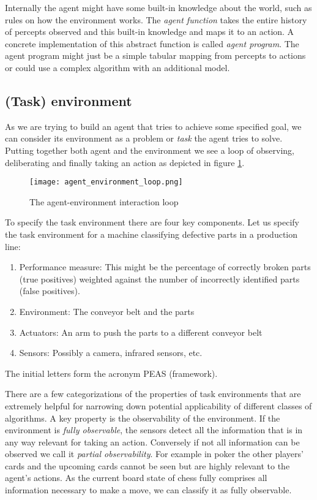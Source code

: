 Internally the agent might have some built-in knowledge about the world, such as rules on how the environment works. The \textit{agent function} takes the entire history of percepts observed and this built-in knowledge and maps it to an action. A concrete implementation of this abstract function is called \textit{agent program}. The agent program might just be a simple tabular mapping from percepts to actions or could use a complex algorithm with an additional model.

\subsection{(Task) environment}
\label{environment}

As we are trying to build an agent that tries to achieve some specified goal, we can consider its environment as a problem or \textit{task} the agent tries to solve. Putting together both agent and the environment we see a loop of observing,  deliberating and finally taking an action as depicted in figure \ref{agent_environment_loop}.

\begin{figure}
    \centering
    \texttt{[image: agent\_environment\_loop.png]}
    \caption{The agent-environment interaction loop \cite[cf. p. 96]{russell_artificial_2021}}
    \label{agent_environment_loop}
\end{figure}

To specify the task environment there are four key components. Let us specify the task environment for a machine classifying defective parts in a production line:

\begin{enumerate}
    \item Performance measure: This might be the percentage of correctly broken parts (true positives) weighted against the number of incorrectly identified parts (false positives).
    \item Environment: The conveyor belt and the parts
    \item Actuators: An arm to push the parts to a different conveyor belt
    \item Sensors: Possibly a camera, infrared sensors, etc.
\end{enumerate}

The initial letters form the acronym PEAS (framework).

There are a few categorizations of the properties of task environments that are extremely helpful for narrowing down potential applicability of different classes of algorithms. A key property is the observability of the environment. If the environment is \textit{fully observable}, the sensors detect all the information that is in any way relevant for taking an action. Conversely if not all information can be observed we call it \textit{partial observability}. For example in poker the other players' cards and the upcoming cards cannot be seen but are highly relevant to the agent's actions. As the current board state of chess fully comprises all information necessary to make a move, we can classify it as fully observable.

